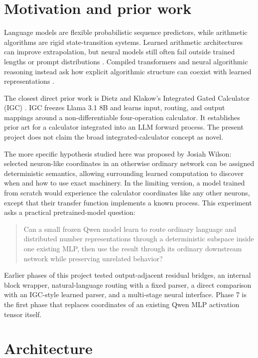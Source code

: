 \documentclass[11pt]{article}
\begin{document}
\section{Motivation and prior work}

Language models are flexible probabilistic sequence predictors, while
arithmetic algorithms are rigid state-transition systems. Learned arithmetic
architectures can improve extrapolation, but neural models still often fail
outside trained lengths or prompt distributions
\cite{trask2018,jelassi2023,cho2024}. Compiled transformers and neural
algorithmic reasoning instead ask how explicit algorithmic structure can
coexist with learned representations \cite{lindner2023,bounsi2024}.

The closest direct prior work is Dietz and Klakow's Integrated Gated
Calculator (IGC) \cite{dietz2025}. IGC freezes Llama 3.1 8B and learns
input, routing, and output mappings around a non-differentiable
four-operation calculator. It establishes prior art for a calculator
integrated into an LLM forward process. The present project does not claim the
broad integrated-calculator concept as novel.

The more specific hypothesis studied here was proposed by Josiah Wilson:
selected neuron-like coordinates in an otherwise ordinary network can be
assigned deterministic semantics, allowing surrounding learned computation to
discover when and how to use exact machinery. In the limiting version, a model
trained from scratch would experience the calculator coordinates like any
other neurons, except that their transfer function implements a known process.
This experiment asks a practical pretrained-model question:

\begin{quote}
Can a small frozen Qwen model learn to route ordinary language and distributed
number representations through a deterministic subspace inside one existing
MLP, then use the result through its ordinary downstream network while
preserving unrelated behavior?
\end{quote}

Earlier phases of this project tested output-adjacent residual bridges, an
internal block wrapper, natural-language routing with a fixed parser, a direct
comparison with an IGC-style learned parser, and a multi-stage neural
interface. Phase 7 is the first phase that replaces coordinates of an existing
Qwen MLP activation tensor itself.

\section{Architecture}
\end{document}
